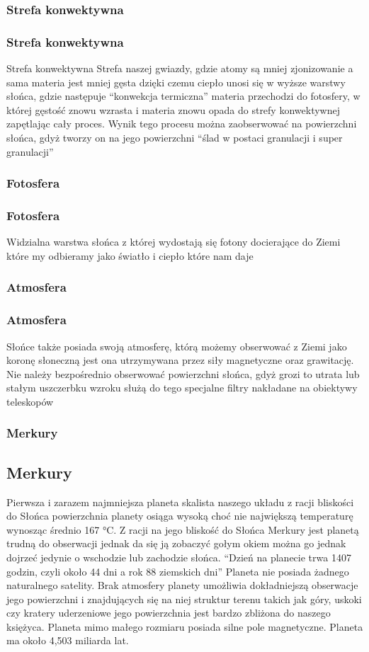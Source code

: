 \begin{frame}
\frametitle{Strefa konwektywna}
\subsubsection{Strefa konwektywna}
Strefa konwektywna Strefa naszej gwiazdy, gdzie atomy są mniej zjonizowanie a sama materia jest mniej gęsta dzięki czemu ciepło unosi się w wyższe warstwy słońca, gdzie następuje “konwekcja termiczna” materia przechodzi do fotosfery, w której gęstość znowu wzrasta i materia znowu opada do strefy konwektywnej zapętlając cały proces. Wynik tego procesu można zaobserwować na powierzchni słońca, gdyż tworzy on na jego powierzchni “ślad w postaci granulacji i super granulacji”
\end{frame}

\begin{frame}
\frametitle{Fotosfera}
\subsubsection{Fotosfera}
Widzialna warstwa słońca z której wydostają się fotony docierające do Ziemi które my odbieramy jako światło i ciepło które nam daje
\end{frame}

\begin{frame}
\frametitle{Atmosfera}
\subsubsection{Atmosfera}
Słońce także posiada swoją atmosferę, którą możemy obserwować z Ziemi jako koronę słoneczną jest ona utrzymywana przez siły magnetyczne oraz grawitację. Nie należy bezpośrednio obserwować powierzchni słońca, gdyż grozi to utrata lub stałym uszczerbku wzroku służą do tego specjalne filtry nakładane na obiektywy teleskopów
\end{frame}

\begin{frame}
\frametitle{Merkury}
\subsection{Merkury}
Pierwsza i zarazem najmniejsza planeta skalista naszego układu z racji bliskości do Słońca powierzchnia planety osiąga wysoką choć nie największą temperaturę wynosząc średnio 167 °C. Z racji na jego bliskość do Słońca Merkury jest planetą trudną do obserwacji jednak da się ją zobaczyć gołym okiem można go jednak dojrzeć jedynie o wschodzie lub zachodzie słońca. “Dzień na planecie trwa 1407 godzin, czyli około 44 dni a rok 88 ziemskich dni” Planeta nie posiada żadnego naturalnego satelity. Brak atmosfery planety umożliwia dokładniejszą obserwacje jego powierzchni i znajdujących się na niej struktur terenu takich jak góry, uskoki czy kratery uderzeniowe jego powierzchnia jest bardzo zbliżona do naszego księżyca. Planeta mimo małego rozmiaru posiada silne pole magnetyczne. Planeta ma około 4,503 miliarda lat.
\end{frame}

